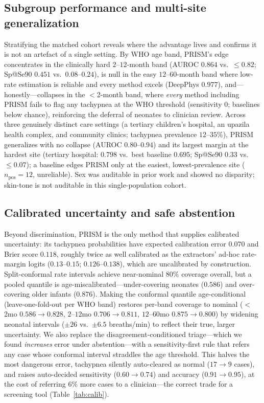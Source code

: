 \subsection{Subgroup performance and multi-site generalization}\label{sec:subgroup}
Stratifying the matched cohort reveals where the advantage lives and confirms it is not an artefact of
a single setting. By WHO age band, PRISM's edge concentrates in the clinically hard $2$--$12$-month
band (AUROC $0.864$ vs.\ $\le0.82$; Sp@Se$90$ $0.451$ vs.\ $0.08$--$0.24$), is null in the easy
$12$--$60$-month band where low-rate estimation is reliable and every method excels (DeepPhys $0.977$),
and---honestly---collapses in the $<$2-month band, where \emph{every} method including PRISM fails to
flag any tachypnea at the WHO threshold (sensitivity $0$; baselines below chance), reinforcing the
deferral of neonates to clinician review. Across three genuinely distinct care settings (a tertiary
children's hospital, an upazila health complex, and community clinics; tachypnea prevalence
$12$--$35\%$), PRISM generalizes with no collapse (AUROC $0.80$--$0.94$) and its largest margin at the
hardest site (tertiary hospital: $0.798$ vs.\ best baseline $0.695$; Sp@Se$90$ $0.33$ vs.\
$\le0.07$); a baseline edges PRISM only at the easiest, lowest-prevalence site ($n_{\text{pos}}{=}12$,
unreliable). Sex was auditable in prior work and showed no disparity; skin-tone is not auditable in
this single-population cohort.

\subsection{Calibrated uncertainty and safe abstention}\label{sec:calib}
Beyond discrimination, PRISM is the only method that supplies calibrated uncertainty: its tachypnea
probabilities have expected calibration error $0.070$ and Brier score $0.118$, roughly twice as well
calibrated as the extractors' ad-hoc rate-margin logits ($0.13$--$0.15$; $0.126$--$0.138$), which are
uncalibrated by construction. Split-conformal rate intervals achieve near-nominal $80\%$ coverage
overall, but a pooled quantile is age-miscalibrated---under-covering neonates ($0.586$) and
over-covering older infants ($0.876$). Making the conformal quantile age-conditional (leave-one-fold-out
per WHO band) restores per-band coverage to nominal ($<$2mo $0.586\!\rightarrow\!0.828$, $2$--$12$mo
$0.706\!\rightarrow\!0.811$, $12$--$60$mo $0.875\!\rightarrow\!0.800$) by widening neonatal intervals
($\pm26$ vs.\ $\pm6.5$ breaths/min) to reflect their true, larger uncertainty. We also replace the
disagreement-conditioned triage---which we found \emph{increases} error under abstention---with a
sensitivity-first rule that refers any case whose conformal interval straddles the age threshold. This
halves the most dangerous error, tachypnea silently auto-cleared as normal ($17\!\rightarrow\!9$
cases), and raises auto-decided sensitivity ($0.60\!\rightarrow\!0.74$) and accuracy
($0.91\!\rightarrow\!0.95$), at the cost of referring $6\%$ more cases to a clinician---the correct
trade for a screening tool (Table~\ref{tab:calib}).

